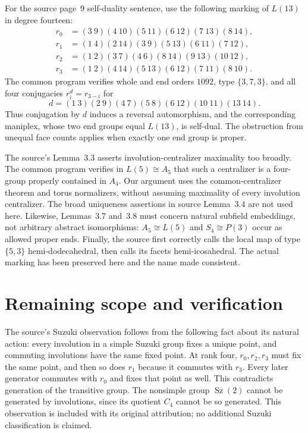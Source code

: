 \documentclass[11pt]{article}
\begin{document}
For the source page~9 self-duality sentence, use the following marking
of $L(13)$ in degree fourteen:
\[
\begin{aligned}
r_0&=(3\ 9)(4\ 10)(5\ 11)(6\ 12)(7\ 13)(8\ 14),\\
r_1&=(1\ 4)(2\ 14)(3\ 9)(5\ 13)(6\ 11)(7\ 12),\\
r_2&=(1\ 2)(3\ 7)(4\ 6)(8\ 14)(9\ 13)(10\ 12),\\
r_3&=(1\ 2)(4\ 14)(5\ 13)(6\ 12)(7\ 11)(8\ 10).
\end{aligned}
\]
The common program verifies whole and end orders $1092$, type
$\{3,7,3\}$, and all four conjugacies $r_i^d=r_{3-i}$ for
\[
 d=(1\ 3)(2\ 9)(4\ 7)(5\ 8)(6\ 12)(10\ 11)(13\ 14).
\]
Thus conjugation by $d$ induces a reversal automorphism, and the
corresponding maniplex, whose two end groups equal $L(13)$, is self-dual.
The obstruction from unequal face counts applies when exactly one end
group is proper.

The source's Lemma~3.3 asserts involution-centralizer maximality too
broadly. The common program verifies in $L(5)\cong A_5$ that such a
centralizer is a four-group properly contained in $A_4$. Our argument
uses the common-centralizer theorem and torus normalizers, without
assuming maximality of every involution centralizer. The broad
uniqueness assertions in source Lemma~3.4 are not used here.
Likewise, Lemmas~3.7 and~3.8 must concern natural subfield embeddings,
not arbitrary abstract isomorphisms: $A_5\cong L(5)$ and
$S_4\cong P(3)$ occur as allowed proper ends. Finally, the source first
correctly calls the local map of type $\{5,3\}$ hemi-dodecahedral,
then calls its facets hemi-icosahedral. The actual marking has been
preserved here and the name made consistent.

\section{Remaining scope and verification}
The source's Suzuki observation follows from the following fact about its natural
action: every involution in a simple Suzuki group fixes a unique point,
and commuting involutions have the same fixed point. At rank four,
$r_0,r_2,r_3$ must fix the same point, and then so does $r_1$ because
it commutes with $r_3$. Every later generator commutes with $r_0$ and
fixes that point as well. This contradicts generation of the transitive
group. The nonsimple group $\operatorname{Sz}(2)$ cannot be generated
by involutions, since its quotient $C_4$ cannot be so generated.
This observation is included with its original attribution; no additional
Suzuki classification is claimed.
\end{document}
